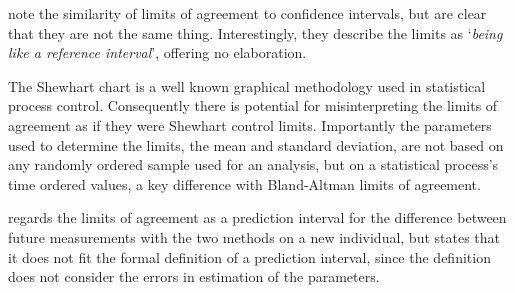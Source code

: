 \documentclass[12pt, a4paper]{report}
\theoremstyle{plain}
\theoremstyle{definition}
\theoremstyle{remark}
\begin{document}
	
	
	\citet{BA99} note the similarity of limits of agreement to
	confidence intervals, but are clear that they are not the same thing. Interestingly, they describe the limits as `\textit{being like a reference interval}', offering no elaboration.
	
	The Shewhart chart is a well known graphical
	methodology used in statistical process control. Consequently
	there is potential for misinterpreting the limits of agreement as
	if they were Shewhart control limits. Importantly the
	parameters used to determine the limits, the mean and standard
	deviation, are not based on any randomly ordered sample used for an analysis, but on a statistical process's time ordered values, a key difference with Bland-Altman limits of agreement.
	
	
	\citet{BXC2008} regards the limits of agreement as a prediction interval for the difference between future measurements with the two methods on a new individual, but states that it does not fit the formal definition of a prediction interval, since the
	definition does not consider the errors in estimation of the parameters. 
	
\end{document}
